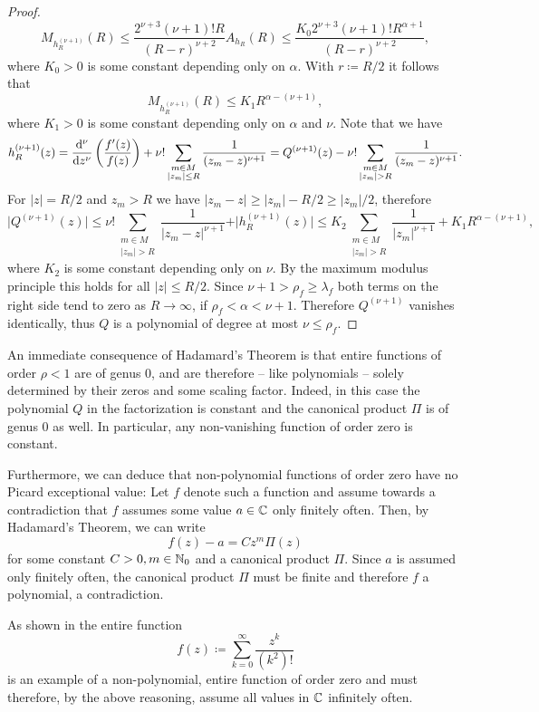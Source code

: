 \begin{proof}
    $$ M_{h_R^{(\nu + 1)}}(R) \leq \frac{2^{\nu + 3} (\nu + 1)! R}{(R - r)^{\nu + 2}} A_{h_R}(R) \leq \frac{K_0 2^{\nu + 3} (\nu + 1)! R^{\alpha + 1}}{(R - r)^{\nu + 2}}, $$
    where $K_0 > 0$ is some constant depending only on $\alpha$. With $r \coloneqq R / 2$ it follows that
    $$ M_{h_R^{(\nu + 1)}}(R) \leq K_1 R^{\alpha - (\nu + 1)}, $$
    where $K_1 > 0$ is some constant depending only on $\alpha$ and $\nu$. Note that we have
    $$ h_R^{(\nu + 1)}(z) = \frac{\mathrm{d}^{\nu}}{\mathrm{d} {z}^{\nu}} \left( \frac{f'(z)}{f(z)} \right) + \nu! \sum_{\substack{m \in M \\ \vert z_m \vert \leq R}} \frac{1}{(z_m - z)^{\nu + 1}} = Q^{(\nu + 1)}(z) - \nu! \sum_{\substack{m \in M \\ \vert z_m \vert > R}} \frac{1}{(z_m - z)^{\nu + 1}}. $$
    For $\vert z \vert = R / 2$ and $z_m > R$ we have $\vert z_m - z \vert \geq \vert z_m \vert - R / 2 \geq \vert z_m \vert / 2$, therefore
    $$ \vert Q^{(\nu+1)}(z) \vert \leq \nu! \sum_{\substack{m \in M \\ \vert z_m \vert > R}} \frac{1}{\vert z_m - z \vert^{\nu + 1}} + \vert h_R^{(\nu + 1)}(z) \vert \leq K_2 \sum_{\substack{m \in M \\ \vert z_m \vert > R}} \frac{1}{\vert z_m \vert^{\nu + 1}} + K_1 R^{\alpha - (\nu + 1)}, $$
    where $K_2$ is some constant depending only on $\nu$. By the maximum modulus principle this holds for all $\vert z \vert \leq R / 2$. Since $\nu + 1 > \rho_f \geq \lambda_f$ both terms on the right side tend to zero as $R \to \infty$, if $\rho_f < \alpha < \nu + 1$. Therefore $Q^{(\nu + 1)}$ vanishes identically, thus $Q$ is a polynomial of degree at most $\nu \leq \rho_f$.
\end{proof}

\begin{remark} \label{rem:consequences-hadamard}
    An immediate consequence of Hadamard's Theorem is that entire functions of order $\rho < 1$ are of genus $0$, and are therefore -- like polynomials -- solely determined by their zeros and some scaling factor. Indeed, in this case the polynomial $Q$ in the factorization is constant and the canonical product $\Pi$ is of genus $0$ as well. In particular, any non-vanishing function of order zero is constant.

    Furthermore, we can deduce that non-polynomial functions of order zero have no Picard exceptional value: Let $f$ denote such a function and assume towards a contradiction that $f$ assumes some value $a \in \mathbb{C}$ only finitely often. Then, by Hadamard's Theorem, we can write
    $$ f(z) - a = C z^m \Pi(z) $$
    for some constant $C > 0, m \in \mathbb{N}_0$ and a canonical product $\Pi$. Since $a$ is assumed only finitely often, the canonical product $\Pi$ must be finite and therefore $f$ a polynomial, a contradiction.
    
    As shown in  the entire function
    $$ f(z) \coloneqq \sum_{k=0}^\infty \frac{z^k}{(k^2)!} $$
    is an example of a non-polynomial, entire function of order zero and must therefore, by the above reasoning, assume all values in $\mathbb{C}$ infinitely often.
\end{remark}

